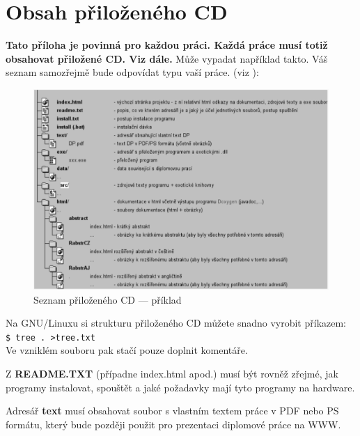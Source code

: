 \chapter{Obsah přiloženého CD}
\textbf{\large Tato příloha je povinná pro každou práci. Každá práce musí totiž obsahovat přiložené CD. Viz dále.}
Může vypadat například takto. Váš seznam samozřejmě bude odpovídat typu vaší práce. (viz \cite{infodp}):
\begin{figure}[h]
\begin{center}
\includegraphics[width=14cm]{figures/seznamcd}
\caption{Seznam přiloženého CD --- příklad}
\label{fig:seznamcd}
\end{center}
\end{figure}
Na GNU/Linuxu si strukturu přiloženého CD můžete snadno vyrobit příkazem:\\ 
\verb|$ tree . >tree.txt|\\
Ve vzniklém souboru pak stačí pouze doplnit komentáře.

Z \textbf{README.TXT} (případne index.html apod.)  musí být rovněž zřejmé, jak programy instalovat, spouštět a jaké požadavky mají tyto programy na hardware.

Adresář \textbf{text}  musí obsahovat soubor s vlastním textem práce v PDF nebo PS formátu, který bude později použit pro prezentaci diplomové práce na WWW.

